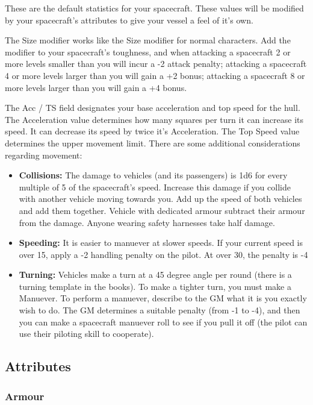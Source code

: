\begin{multicols}{2}

These are the default statistics for your spacecraft. These values will be modified by your spacecraft's attributes to give your vessel a feel of it's own.

The Size modifier works like the Size modifier for normal characters. Add the modifier to your spacecraft's toughness, and when attacking a spacecraft 2 or more levels smaller than you will incur a -2 attack penalty; attacking a spacecraft 4 or more levels larger than you will gain a +2 bonus; attacking a spacecraft 8 or more levels larger than you will gain a +4 bonus.

The Acc / TS field designates your base acceleration and top speed for the hull. The Acceleration value determines how many squares per turn it can increase its speed. It can decrease its speed by twice it's Acceleration. The Top Speed value determines the upper movement limit. There are some additional considerations regarding movement:

\begin{itemize}
  \item \textbf{Collisions:} The damage to vehicles (and its passengers) is 1d6 for every multiple of 5 of the spacecraft's speed. Increase this damage if you collide with another vehicle moving towards you. Add up the speed of both vehicles and add them together. Vehicle with dedicated armour subtract their armour from the damage. Anyone wearing safety harnesses take half damage.
  \item \textbf{Speeding:} It is easier to manuever at slower speeds. If your current speed is over 15, apply a -2 handling penalty on the pilot. At over 30, the penalty is -4
  \item \textbf{Turning:} Vehicles make a turn at a 45 degree angle per round (there is a turning template in the books). To make a tighter turn, you must make a Manuever. To perform a manuever, describe to the GM what it is you exactly wish to do. The GM determines a suitable penalty (from -1 to -4), and then you can make a spacecraft manuever roll to see if you pull it off (the pilot can use their piloting skill to cooperate).
\end{itemize}
  
\subsection{Attributes}

\subsubsection{Armour}


\end{multicols}
